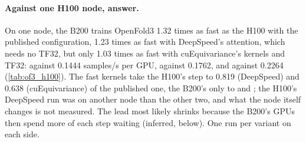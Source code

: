 \paragraph{Against one H100 node, answer.} On one node, the B200 trains OpenFold3 1.32 times as fast as the H100 with the published configuration, 1.23 times as fast with DeepSpeed's attention, which needs no TF32, but only 1.03 times as fast with cuEquivariance's kernels and TF32: \TriOfSpsPubOne{} against 0.1444 samples/s per GPU, \TriOfSpsDsOne{} against 0.1762, and \TriOfSpsCueqOne{} against 0.2264 (\cref{tab:of3_h100}). The fast kernels take the H100's step to 0.819 (DeepSpeed) and 0.638 (cuEquivariance) of the published one, the B200's only to \TriOfRatioDsOne{} and \TriOfRatioCueqOne; the H100's DeepSpeed run was on another node than the other two, and what the node itself changes is not measured. The lead most likely shrinks because the B200's GPUs then spend more of each step waiting (inferred, below). One run per variant on each side.

